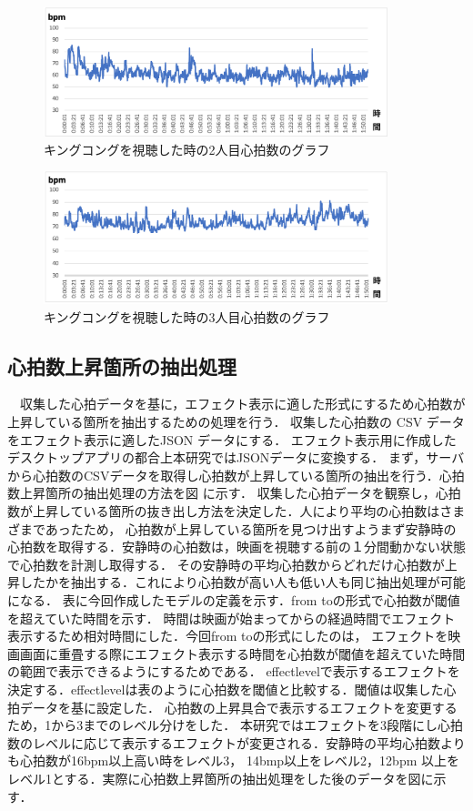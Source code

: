 \begin{figure}[H]
    \centering
    \includegraphics[width=10cm]{images/chapter3/gurafu.png}
    \caption{キングコングを視聴した時の2人目心拍数のグラフ}
\end{figure}

\begin{figure}[H]
    \centering
    \includegraphics[width=10cm]{images/chapter3/gurafu1.png}
    \caption{キングコングを視聴した時の3人目心拍数のグラフ}
\end{figure}

\subsection{心拍数上昇箇所の抽出処理}
　収集した心拍データを基に，エフェクト表示に適した形式にするため心拍数が上昇している箇所を抽出するための処理を行う．
収集した心拍数の CSV データをエフェクト表示に適したJSON データにする．
エフェクト表示用に作成したデスクトップアプリの都合上本研究ではJSONデータに変換する．
まず，サーバから心拍数のCSVデータを取得し心拍数が上昇している箇所の抽出を行う．心拍数上昇箇所の抽出処理の方法を図 に示す．
収集した心拍データを観察し，心拍数が上昇している箇所の抜き出し方法を決定した．人により平均の心拍数はさまざまであったため，
心拍数が上昇している箇所を見つけ出すようまず安静時の心拍数を取得する．安静時の心拍数は，映画を視聴する前の１分間動かない状態で心拍数を計測し取得する．
その安静時の平均心拍数からどれだけ心拍数が上昇したかを抽出する．これにより心拍数が高い人も低い人も同じ抽出処理が可能になる．
表に今回作成したモデルの定義を示す．from toの形式で心拍数が閾値を超えていた時間を示す．
時間は映画が始まってからの経過時間でエフェクト表示するため相対時間にした．今回from toの形式にしたのは，
エフェクトを映画画面に重畳する際にエフェクト表示する時間を心拍数が閾値を超えていた時間の範囲で表示できるようにするためである．
effectlevelで表示するエフェクトを決定する．effectlevelは表のように心拍数を閾値と比較する．閾値は収集した心拍データを基に設定した．
心拍数の上昇具合で表示するエフェクトを変更するため，1から3までのレベル分けをした．
本研究ではエフェクトを3段階にし心拍数のレベルに応じて表示するエフェクトが変更される．安静時の平均心拍数よりも心拍数が16bpm以上高い時をレベル3，
14bmp以上をレベル2，12bpm 以上をレベル1とする．実際に心拍数上昇箇所の抽出処理をした後のデータを図に示す．


